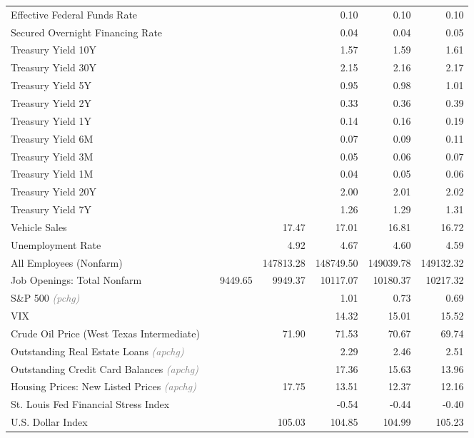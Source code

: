 \documentclass[11pt, letterpaper]{article}\usepackage[]{graphicx}\usepackage[]{color}
\begin{document}
\begin{table}[H]
\begin{tabular}{lrrrrrr}
  Effective Federal Funds Rate &  &  &  & 0.10 & 0.10 & 0.10 \\ 
  Secured Overnight Financing Rate &  &  &  & 0.04 & 0.04 & 0.05 \\ 
  Treasury Yield 10Y &  &  &  & 1.57 & 1.59 & 1.61 \\ 
  Treasury Yield 30Y &  &  &  & 2.15 & 2.16 & 2.17 \\ 
  Treasury Yield 5Y &  &  &  & 0.95 & 0.98 & 1.01 \\ 
  Treasury Yield 2Y &  &  &  & 0.33 & 0.36 & 0.39 \\ 
  Treasury Yield 1Y &  &  &  & 0.14 & 0.16 & 0.19 \\ 
  Treasury Yield 6M &  &  &  & 0.07 & 0.09 & 0.11 \\ 
  Treasury Yield 3M &  &  &  & 0.05 & 0.06 & 0.07 \\ 
  Treasury Yield 1M &  &  &  & 0.04 & 0.05 & 0.06 \\ 
  Treasury Yield 20Y &  &  &  & 2.00 & 2.01 & 2.02 \\ 
  Treasury Yield 7Y &  &  &  & 1.26 & 1.29 & 1.31 \\ 
  Vehicle Sales &  &  & 17.47 & 17.01 & 16.81 & 16.72 \\ 
  Unemployment Rate &  &  & 4.92 & 4.67 & 4.60 & 4.59 \\ 
  All Employees (Nonfarm) &  &  & 147813.28 & 148749.50 & 149039.78 & 149132.32 \\ 
  Job Openings: Total Nonfarm &  & 9449.65 & 9949.37 & 10117.07 & 10180.37 & 10217.32 \\ 
  S\&P 500 \textit{\footnotesize\textcolor{gray}{(pchg)}} &  &  &  & 1.01 & 0.73 & 0.69 \\ 
  VIX &  &  &  & 14.32 & 15.01 & 15.52 \\ 
  Crude Oil Price (West Texas Intermediate) &  &  & 71.90 & 71.53 & 70.67 & 69.74 \\ 
  Outstanding Real Estate Loans \textit{\footnotesize\textcolor{gray}{(apchg)}} &  &  &  & 2.29 & 2.46 & 2.51 \\ 
  Outstanding Credit Card Balances \textit{\footnotesize\textcolor{gray}{(apchg)}} &  &  &  & 17.36 & 15.63 & 13.96 \\ 
  Housing Prices: New Listed Prices \textit{\footnotesize\textcolor{gray}{(apchg)}} &  &  & 17.75 & 13.51 & 12.37 & 12.16 \\ 
  St. Louis Fed Financial Stress Index &  &  &  & -0.54 & -0.44 & -0.40 \\ 
  U.S. Dollar Index &  &  & 105.03 & 104.85 & 104.99 & 105.23 \\ 

\end{tabular}
\end{table}
\end{document}
